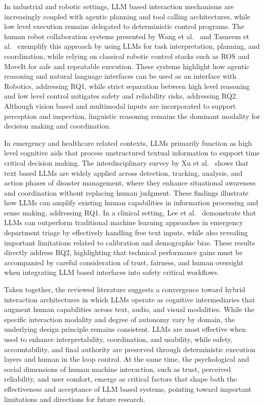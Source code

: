 In industrial and robotic settings, LLM based interaction mechanisms are increasingly coupled with agentic planning and tool calling architectures, while low level execution remains delegated to deterministic control programs. 
The human robot collaboration systems presented by Wang et al.~\cite{wang2026llmharnessing} and Tasneem et al.~\cite{tasneem2025humanrobot} exemplify this approach by using LLMs for task interpretation, planning, and coordination, while relying on classical robotic control stacks such as ROS and MoveIt for safe and repeatable execution. 
These systems highlight how agentic reasoning and natural language interfaces can be used as an interface with Robotics, addressing RQ1, while strict separation between high level reasoning and low level control mitigates safety and reliability risks, addressing RQ2. 
Although vision based and multimodal inputs are incorporated to support perception and inspection, linguistic reasoning remains the dominant modality for decision making and coordination.

In emergency and healthcare related contexts, LLMs primarily function as high level cognitive aids that process unstructured textual information to support time critical decision making. The interdisciplinary survey by Xu et al.~\cite{Xu2025LLMdisaster} shows that text based LLMs are widely applied across detection, tracking, analysis, and action phases of disaster management, where they enhance situational awareness and coordination without replacing human judgment. 
These findings illustrate how LLMs can amplify existing human capabilities in information processing and sense making, addressing RQ1. 
In a clinical setting, Lee et al.~\cite{lee2025llm_triage_bias} demonstrate that LLMs can outperform traditional machine learning approaches in emergency department triage by effectively handling free text inputs, while also revealing important limitations related to calibration and demographic bias. 
These results directly address RQ2, highlighting that technical performance gains must be accompanied by careful consideration of trust, fairness, and human oversight when integrating LLM based interfaces into safety critical workflows.

Taken together, the reviewed literature suggests a convergence toward hybrid interaction architectures in which LLMs operate as cognitive intermediaries that augment human capabilities across text, audio, and visual modalities. 
While the specific interaction modality and degree of autonomy vary by domain, the underlying design principle remains consistent. 
LLMs are most effective when used to enhance interpretability, coordination, and usability, while safety, accountability, and final authority are preserved through deterministic execution layers and human in the loop control. 
At the same time, the psychological and social dimensions of human machine interaction, such as trust, perceived reliability, and user comfort, emerge as critical factors that shape both the effectiveness and acceptance of LLM based systems, pointing toward important limitations and directions for future research.

